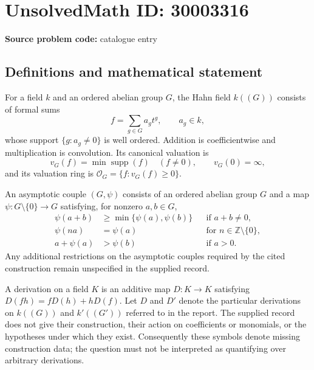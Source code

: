 \documentclass[11pt]{article}
\newcommand{\Z}{\mathbb{Z}}
\begin{document}
\section*{UnsolvedMath ID: 30003316}
\textbf{Source problem code:} catalogue entry
\subsection{Definitions and mathematical statement}
For a field \(k\) and an ordered abelian group \(G\), the Hahn field \(k((G))\) consists of formal sums
\[
f=\sum_{g\in G}a_g t^g,\qquad a_g\in k,
\]
whose support \(\{g:a_g\ne0\}\) is well ordered. Addition is coefficientwise and multiplication is convolution. Its canonical valuation is
\[
v_G(f)=\min\operatorname{supp}(f)\quad(f\ne0),\qquad v_G(0)=\infty,
\]
and its valuation ring is \(\mathcal O_G=\{f:v_G(f)\ge0\}\).

An asymptotic couple \((G,\psi)\) consists of an ordered abelian group \(G\) and a map \(\psi:G\setminus\{0\}\to G\) satisfying, for nonzero \(a,b\in G\),
\[
\begin{aligned}
\psi(a+b)&\ge\min\{\psi(a),\psi(b)\} &&\text{if }a+b\ne0,\\
\psi(na)&=\psi(a) &&\text{for }n\in\Z\setminus\{0\},\\
a+\psi(a)&>\psi(b) &&\text{if }a>0.
\end{aligned}
\]
Any additional restrictions on the asymptotic couples required by the cited construction remain unspecified in the supplied record.

A derivation on a field \(K\) is an additive map \(D:K\to K\) satisfying \(D(fh)=fD(h)+hD(f)\). Let \(D\) and \(D'\) denote the particular derivations on \(k((G))\) and \(k'((G'))\) referred to in the report. The supplied record does not give their construction, their action on coefficients or monomials, or the hypotheses under which they exist. Consequently these symbols denote missing construction data; the question must not be interpreted as quantifying over arbitrary derivations.
\end{document}
